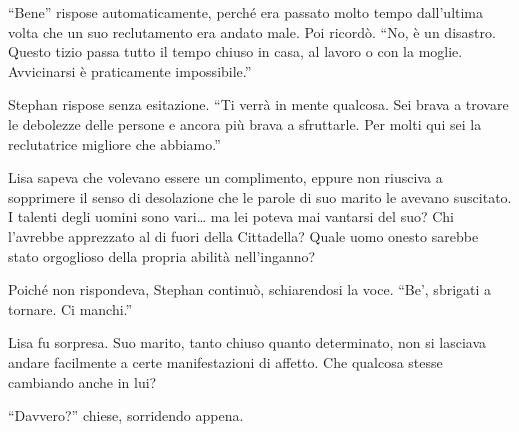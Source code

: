 \documentclass[a4paper,oneside,11pt]{memoir}
\begin{document}
``Bene'' rispose automaticamente, perché era passato molto tempo dall'ultima
volta che un suo reclutamento era andato male. Poi ricordò. ``No, è un disastro.
Questo tizio passa tutto il tempo chiuso in casa, al lavoro o con la moglie.
Avvicinarsi è praticamente impossibile.''

Stephan rispose senza esitazione. ``Ti verrà in mente qualcosa. Sei brava a
trovare le debolezze delle persone e ancora più brava a sfruttarle. Per molti
qui sei la reclutatrice migliore che abbiamo.''

Lisa sapeva che volevano essere un complimento, eppure non riusciva a sopprimere
il senso di desolazione che le parole di suo marito le avevano suscitato. I
talenti degli uomini sono vari\dots{} ma lei poteva mai vantarsi del suo? Chi
l'avrebbe apprezzato al di fuori della Cittadella? Quale uomo onesto sarebbe
stato orgoglioso della propria abilità nell'inganno?

%
%
%

Poiché non rispondeva, Stephan continuò, schiarendosi la voce. ``Be', sbrigati
a tornare. Ci manchi.''

Lisa fu sorpresa. Suo marito, tanto chiuso quanto determinato, non si lasciava
andare facilmente a certe manifestazioni di affetto. Che qualcosa stesse
cambiando anche in lui?

``Davvero?'' chiese, sorridendo appena.
\end{document}
